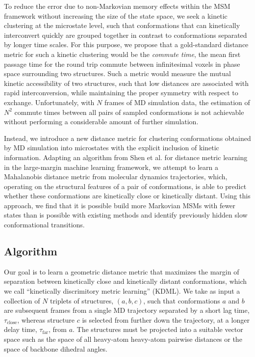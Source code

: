 \documentclass[twocolumn,floatfix,nofootinbib,aps]{revtex4-1}
\begin{document}
To reduce the error due to non-Markovian memory effects within the MSM framework without increasing the size of the state space, we seek a kinetic clustering at the microstate level, such that conformations that can kinetically interconvert quickly are grouped together in contrast to conformations separated by longer time scales. For this purpose, we propose that a gold-standard distance metric for such a kinetic clustering would be the \emph{commute time}, the mean first passage time for the round trip commute between infinitesimal voxels in phase space surrounding two structures. Such a metric would measure the mutual kinetic accessibility of two structures, such that low distances are associated with rapid interconversion, while maintaining the proper symmetry with respect to exchange. Unfortunately, with $N$ frames of MD simulation data, the estimation of $N^2$ commute times between all pairs of sampled conformations is not achievable without performing a considerable amount of further simulation.

Instead, we introduce a new distance metric for clustering conformations obtained by MD simulation into microstates with the explicit inclusion of kinetic information. Adapting an algorithm from Shen et al. for distance metric learning in the large-margin machine learning framework,\cite{Shen:2010df} we attempt to learn a Mahalanobis distance metric from molecular dynamics trajectories, which, operating on the structural features of a pair of conformations, is able to predict whether these conformations are kinetically close or kinetically distant. Using this approach, we find that it is possible build more Markovian MSMs with fewer states than is possible with existing methods and identify previously hidden slow conformational transitions.

\subsection{Algorithm}

Our goal is to learn a geometric distance metric that maximizes the margin of separation between kinetically close and kinetically distant conformations, which we call ``kinetically discrimitory metric learning'' (KDML). We take as input a collection of $N$ triplets of structures, $(a, b, c)$, such that conformations $a$ and $b$ are subsequent frames from a single MD trajectory separated by a short lag time, $\tau_\mathrm{close}$, whereas structure $c$ is selected from further down the trajectory, at a longer delay time, $\tau_\mathrm{far}$, from $a$. The structures must be projected into a suitable vector space such as the space of all heavy-atom heavy-atom pairwise distances or the space of backbone dihedral angles.
\end{document}
